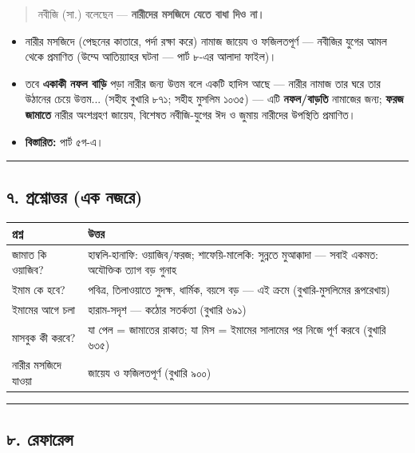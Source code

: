 \begin{quote}
নবীজি (সা.) বলেছেন — \textbf{নারীদের মসজিদে যেতে বাধা দিও না।}
\end{quote}

\begin{itemize}
\item নারীর মসজিদে (পেছনের কাতারে, পর্দা রক্ষা করে) নামাজ জায়েয ও ফজিলতপূর্ণ — নবীজির যুগের আমল থেকে প্রমাণিত (উম্মে আতিয়্যাহর ঘটনা — পার্ট ৮-এর আলাদা ফাইল)।
\item তবে \textbf{একাকী নফল বাড়ি} পড়া নারীর জন্য উত্তম বলে একটি হাদিস আছে — নারীর নামাজ তার ঘরে তার উঠানের চেয়ে উত্তম... (সহীহ বুখারি ৮৭১; সহীহ মুসলিম ১০৩৫) — এটি \textbf{নফল/বাড়তি} নামাজের জন্য; \textbf{ফরজ জামাতে} নারীর অংশগ্রহণ জায়েয, বিশেষত নবীজি-যুগের ঈদ ও জুমায় নারীদের উপস্থিতি প্রমাণিত।
\item \textbf{বিস্তারিত:} পার্ট ৫গ-এ।
\end{itemize}
\medskip\hrule\medskip

\subsection*{৭. প্রশ্নোত্তর (এক নজরে)}

\begin{table}[h]\centering\small
\begin{tabular}{ll}
প্রশ্ন & উত্তর \\
\hline
জামাত কি ওয়াজিব? & হাম্বলি-হানাফি: ওয়াজিব/ফরজ; শাফেয়ি-মালেকি: সুন্নতে মুআক্কাদা — সবাই একমত: অযৌক্তিক ত্যাগ বড় গুনাহ \\
ইমাম কে হবে? & পবিত্র, তিলাওয়াতে সুদক্ষ, ধার্মিক, বয়সে বড় — এই ক্রমে (বুখারি-মুসলিমের রূপরেখায়) \\
ইমামের আগে চলা & হারাম-সদৃশ — কঠোর সতর্কতা (বুখারি ৬৯১) \\
মাসবুক কী করবে? & যা পেল = জামাতের রাকাত; যা মিস = ইমামের সালামের পর নিজে পূর্ণ করবে (বুখারি ৬৩৫) \\
নারীর মসজিদে যাওয়া & জায়েয ও ফজিলতপূর্ণ (বুখারি ৯০০) \\
\hline
\end{tabular}
\end{table}

\medskip\hrule\medskip

\subsection*{৮. রেফারেন্স}


